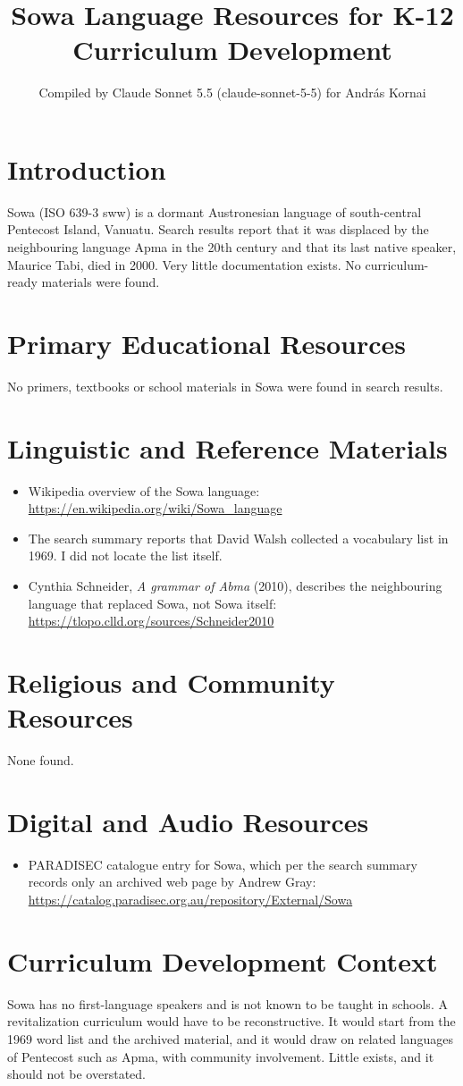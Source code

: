 \documentclass[12pt]{article}
\title{Sowa Language Resources for K-12 Curriculum Development}
\author{Compiled by Claude Sonnet 5.5 (claude-sonnet-5-5) for Andr\'as Kornai}
\date{}
\begin{document}
\maketitle

\section{Introduction}
Sowa (ISO 639-3 sww) is a dormant Austronesian language of south-central Pentecost Island, Vanuatu. Search results report that it was displaced by the neighbouring language Apma in the 20th century and that its last native speaker, Maurice Tabi, died in 2000. Very little documentation exists. No curriculum-ready materials were found.

\section{Primary Educational Resources}
No primers, textbooks or school materials in Sowa were found in search results.

\section{Linguistic and Reference Materials}
\begin{itemize}
\item Wikipedia overview of the Sowa language: \url{https://en.wikipedia.org/wiki/Sowa_language}
\item The search summary reports that David Walsh collected a vocabulary list in 1969. I did not locate the list itself.
\item Cynthia Schneider, \emph{A grammar of Abma} (2010), describes the neighbouring language that replaced Sowa, not Sowa itself: \url{https://tlopo.clld.org/sources/Schneider2010}
\end{itemize}

\section{Religious and Community Resources}
None found.

\section{Digital and Audio Resources}
\begin{itemize}
\item PARADISEC catalogue entry for Sowa, which per the search summary records only an archived web page by Andrew Gray: \url{https://catalog.paradisec.org.au/repository/External/Sowa}
\end{itemize}

\section{Curriculum Development Context}
Sowa has no first-language speakers and is not known to be taught in schools. A revitalization curriculum would have to be reconstructive. It would start from the 1969 word list and the archived material, and it would draw on related languages of Pentecost such as Apma, with community involvement. Little exists, and it should not be overstated.
\end{document}
